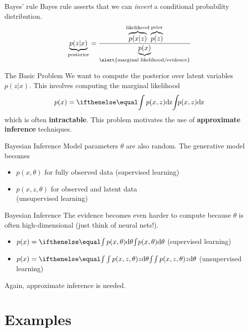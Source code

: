 \documentclass[14pt]{beamer}
\begin{document}
\begin{frame}{Bayes' rule}
Bayes rule asserts that we can \textit{invert} a conditional probability distribution.
\begin{equation}
\underbrace{p(z|x)}_{\text{posterior}} = \frac{\overbrace{p(x|z)}^{\text{likelihood}}\overbrace{p(z)}^{\text{prior}}}{\underbrace{p(x)}_{\text{\alert{marginal likelihood/evidence}}}}
\end{equation}
\end{frame}

\begin{frame}{The Basic Problem}
We want to compute the posterior over latent variables $ p(z|x) $. This involves computing the marginal likelihood
$$ p(x) = \intl{ p(x,z) }{z} $$
which is often \textbf{intractable}. This problem motivates the use of \textbf{approximate inference} techniques.
\end{frame}

\begin{frame}{Bayesian Inference}
Model parameters $ \theta $ are also random. The generative model becomes
\begin{itemize}
\item $ p(x,\theta) $ for fully observed data (supervised learning)
\item $ p(x,z,\theta) $ for observed and latent data \\ (unsupervised learning)
\end{itemize}
\end{frame}

\begin{frame}{Bayesian Inference}
The evidence becomes even harder to compute because $ \theta $ is often high-dimensional
(just think of neural nets!).
\begin{itemize}
\item $ p(x) = \intl{ p(x, \theta)}{\theta} $ (supervised learning)
\item $ p(x) = \intl{ \int{ p(x, z, \theta)} {z}}{\theta} $ (unsupervised learning)
\end{itemize}
\pause
Again, approximate inference is needed.
\end{frame}

\section{Examples}
\end{document}
